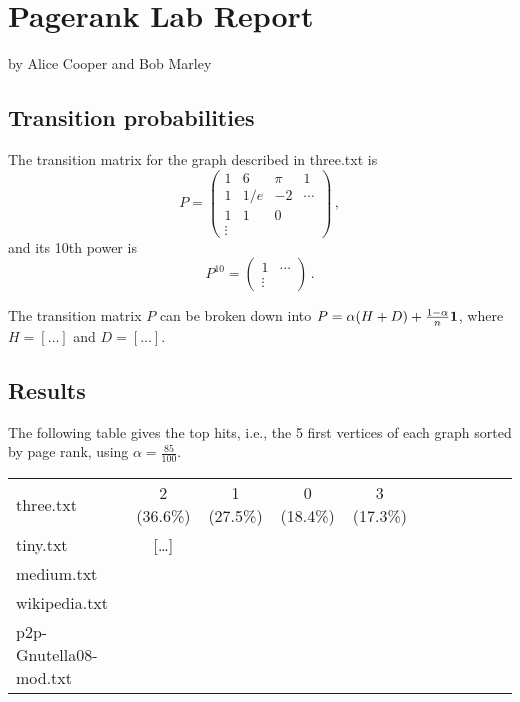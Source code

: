 \documentclass{tufte-handout}
\begin{document}
\newpage
\section{Pagerank Lab Report}


by Alice Cooper and Bob Marley

\subsection{Transition probabilities}

The transition matrix for the graph described in three.txt
is
\begin{equation*}
P = 
\left(
\begin{array}{cccc}
1 & 6 & \pi & 1\\
1 & 1/e & -2  & \cdots\\
1 & 1 & 0 \\
\vdots
\end{array}
\right)\,,
\end{equation*}
and its 10th power is
\begin{equation*}
P^{10} = 
\left(
\begin{array}{cccc}
1 & \cdots\\
\vdots
\end{array}
\right)\,.
\end{equation*}

The transition matrix $P$ can be broken down into  $P = \alpha(H + D)
+ \frac{1-\alpha}{n} \bf 1$, where $H =[\ldots]$ and $D =[\ldots]$.

\subsection{Results}

The following table gives the top hits, i.e., the 5 first vertices of
each graph sorted by page rank, using $\alpha = \frac{85}{100}$.

\medskip
\begin{fullwidth}
\small
\begin{tabular}{lcccccccccc}
three.txt & 2 (36.6\%) & 1 (27.5\%) & 0 (18.4\%) & 3 (17.3\%) \\
tiny.txt & [\ldots] &\\
medium.txt &\\
wikipedia.txt & \\
p2p-Gnutella08-mod.txt &
\end{tabular}
\end{fullwidth}
\end{document}
